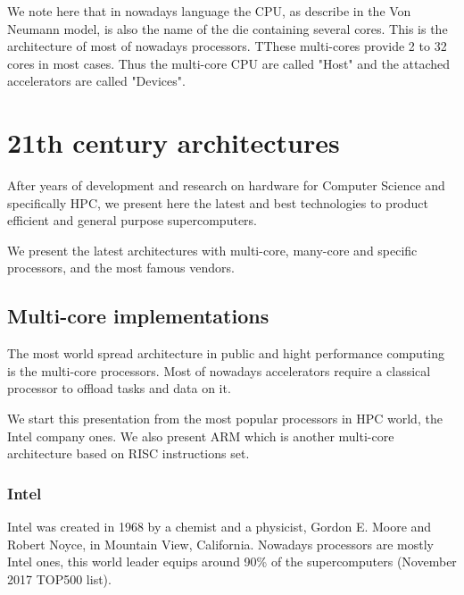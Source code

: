 We note here that in nowadays language the CPU, as describe in the Von Neumann model, is also the name of the die containing several cores. 
This is the architecture of most of nowadays processors. 
TThese multi-cores provide 2 to 32 cores in most cases. 
Thus the multi-core CPU are called "Host" and the attached accelerators are called "Devices".


\section{21th century architectures}
After years of development and research on hardware for Computer Science and specifically HPC, we present here the latest and best technologies to product efficient and general purpose supercomputers.

We present the latest architectures with multi-core, many-core and specific processors, and the most famous vendors. 

\subsection{Multi-core implementations}
The most world spread architecture in public and hight performance computing is the multi-core processors. 
Most of nowadays accelerators require a classical processor to offload tasks and data on it. 

We start this presentation from the most popular processors in HPC world, the Intel company ones. 
We also present ARM which is another multi-core architecture based on RISC instructions set.

\subsubsection{Intel}
Intel was created in 1968 by a chemist and a physicist, Gordon E. Moore and Robert Noyce, in Mountain View, California. 
Nowadays processors are mostly Intel ones, this world leader equips around 90\% of the supercomputers (November 2017 TOP500 list).

